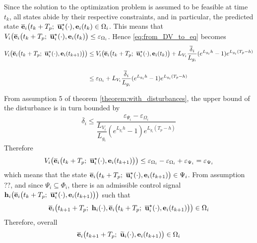 \begin{gg_box}
Since the solution to the optimization problem is assumed to be feasible
at time $t_k$, all states abide by their respective constraints, and in
particular, the predicted state
$\overline{\bm{\mathbf{e}}}_i\big(t_k + T_p;\ \overline{\bm{\mathbf{u}}}_i^{\star}(\cdot), \bm{\mathbf{e}}_i(t_k) \in \Omega_i$.
This means that
$V_i\big(\overline{\vect{e}}_i\big(t_k + T_p;\ \overline{\vect{u}}_i^{\star}(\cdot), \vect{e}_i(t_k)\big) \leq \varepsilon_{\Omega_i}$.
Hence \eqref{eq:from_DV_to_eq} becomes
\begin{align}
  V_i\big(\overline{\vect{e}}_i\big(t_k + T_p;\ \overline{\vect{u}}_i^{\star}(\cdot), \vect{e}_i(t_{k+1})\big)\big)
  &\leq V_i\big(\overline{\vect{e}}_i\big(t_k + T_p;\ \overline{\vect{u}}_i^{\star}(\cdot), \vect{e}_i(t_k)\big) + L_{V_i} \dfrac{\overline{\delta}_i}{L_{g_i}} (e^{L_{g_i}h} - 1) e^{L_{g_i} (T_p - h)} \\[2.5ex]
  &\leq \varepsilon_{\Omega_i} + L_{V_i} \dfrac{\overline{\delta}_i}{L_{g_i}} (e^{L_{g_i}h} - 1) e^{L_{g_i} (T_p - h)}
\label{eq:from_DV_to_eq_2}
\end{align}

From assumption 5 of theorem \eqref{theorem:with_disturbances},
the upper bound of the disturbance is in turn bounded by
\begin{align}
  \overline{\delta}_i \leq \dfrac{\varepsilon_{\Psi_i} - \varepsilon_{\Omega_i}}{\dfrac{L_{V_i}}{L_{g_i}} (e^{L_{g_i}h} - 1) e^{L_{g_i} (T_p - h)}}
\end{align}
Therefore
\begin{align}
  V_i\big(\overline{\vect{e}}_i\big(t_k + T_p;\ \overline{\vect{u}}_i^{\star}(\cdot), \vect{e}_i(t_{k+1})\big)\big)
  \leq  \varepsilon_{\Omega_i} - \varepsilon_{\Omega_i} + \varepsilon_{\Psi_i} = \varepsilon_{\Psi_i}
\end{align}
which means that the state
$\overline{\vect{e}}_i\big(t_k + T_p;\ \overline{\vect{u}}_i^{\star}(\cdot), \vect{e}_i(t_{k+1})\big) \in \Psi_i$.
From assumption ??, and since $\Psi_i \subseteq \Phi_i$, there is an
admissible control signal $\bm{\mathbf{h}}_i\big(\overline{\bm{\mathbf{e}}}_i\big(t_k + T_p;\ \overline{\bm{\mathbf{u}}}_i^{\star}(\cdot), \bm{\mathbf{e}}_i(t_{k+1})\big)\big)$
such that
\begin{align}
  \overline{\vect{e}}_i\big(t_{k+1} + T_p;\ \vect{h}_i(\cdot), \overline{\vect{e}}_i\big(t_k + T_p;\ \overline{\vect{u}}_i^{\star}(\cdot), \vect{e}_i(t_{k+1})\big)\big) \in \Omega_i
\end{align}
Therefore, overall
\begin{align}
  \overline{\vect{e}}_i\big(t_{k+1} + T_p;\ \widetilde{\vect{u}}_i(\cdot), \vect{e}_i(t_{k+1}) \big) \in \Omega_i
\end{align}
\qedsymbol
\end{gg_box}

